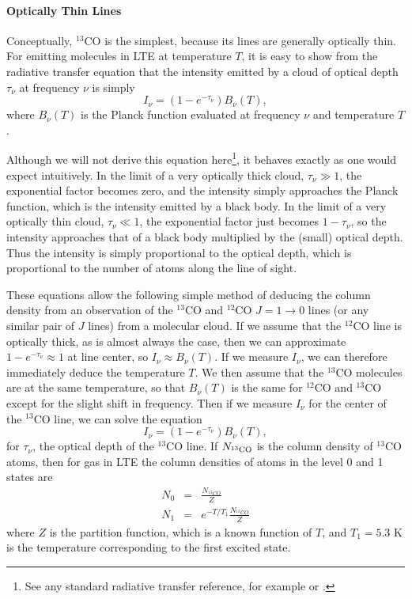 \paragraph{Optically Thin Lines}

Conceptually, $^{13}$CO is the simplest, because its lines are generally optically thin. For emitting molecules in LTE at temperature $T$, it is easy to show from the radiative transfer equation that the intensity emitted by a cloud of optical depth $\tau_{\nu}$ at frequency $\nu$ is simply
\begin{equation}
I_{\nu} = \left(1-e^{-\tau_{\nu}}\right) B_{\nu}(T),
\end{equation}
where $B_{\nu}(T)$ is the Planck function evaluated at frequency $\nu$ and temperature $T$.

Although we will not derive this equation here\footnote{See any standard radiative transfer reference, for example \citet{rybicki86a} or \citet{shu91a}.}, it behaves exactly as one would expect intuitively. In the limit of a very optically thick cloud, $\tau_{\nu}\gg 1$, the exponential factor becomes zero, and the intensity simply approaches the Planck function, which is the intensity emitted by a black body. In the limit of a very optically thin cloud, $\tau_{\nu}\ll 1$, the exponential factor just becomes $1-\tau_{\nu}$, so the intensity approaches that of a black body multiplied by the (small) optical depth. Thus the intensity is simply proportional to the optical depth, which is proportional to the number of atoms along the line of sight.

These equations allow the following simple method of deducing the column density from an observation of the $^{13}$CO and $^{12}$CO $J=1\rightarrow 0$ lines (or any similar pair of $J$ lines) from a molecular cloud. If we assume that the $^{12}$CO line is optically thick, as is almost always the case, then we can approximate $1-e^{-\tau_{\nu}}\approx 1$ at line center, so $I_{\nu} \approx B_{\nu}(T)$. If we measure $I_{\nu}$, we can therefore immediately deduce the temperature $T$. We then assume that the $^{13}$CO molecules are at the same temperature, so that $B_{\nu}(T)$ is the same for $^{12}$CO and $^{13}$CO except for the slight shift in frequency. Then if we measure $I_\nu$ for the center of the $^{13}$CO line, we can solve the equation
\begin{equation}
I_{\nu} = \left(1-e^{-\tau_{\nu}}\right) B_{\nu}(T),
\end{equation}
for $\tau_{\nu}$, the optical depth of the $^{13}$CO line. If $N_{\rm ^{13}CO}$ is the column density of $^{13}$CO atoms, then for gas in LTE the column densities of atoms in the level 0 and 1 states are
\begin{eqnarray*}
N_0 & = & \frac{N_{^{13}CO}}{Z} \\
N_1 & = & e^{-T/T_1}\frac{N_{^{13}CO}}{Z}
\end{eqnarray*}
where $Z$ is the partition function, which is a known function of $T$, and $T_1=5.3$ K is the temperature corresponding to the first excited state.

